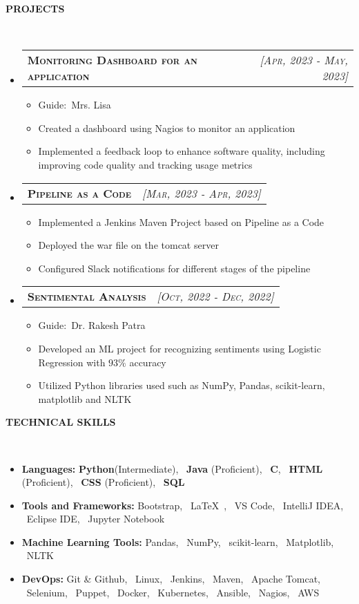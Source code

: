 \documentclass[a4paper,10pt]{article}
\makeatletter
\newcommand{\lsep}{-0.5cm}
\newcommand{\resitem}[1]{\item #1 \vspace{-2pt}}
\newcommand{\resheading}[1]{{\small \colorbox{mygrey}{\begin{minipage}{0.975\textwidth}{\textbf{#1 \vphantom{p\^{E}}}}\end{minipage}}}}
\newcommand{\ressubheading}[3]{
\begin{tabular*}{6.62in}{l @{\extracolsep{\fill}} r}
	\textsc{{\textbf{#1}}} & \textsc{\textit{[#2]}} \\
\end{tabular*}\vspace{-8pt}}
\makeatother
\begin{document}
\resheading{\textbf{PROJECTS} }\\[\lsep]
\begin{itemize}
\setlength\itemsep{0.5em}
\item \ressubheading{Monitoring Dashboard for an application} {Apr, 2023 - May, 2023}{}
\begin{itemize}
    \resitem{Guide:\ Mrs. Lisa}
    \resitem{Created a dashboard using Nagios to monitor an application}
    \resitem{Implemented a feedback loop to enhance software quality, including improving code quality and tracking usage metrics}
\end{itemize}

\item \ressubheading{Pipeline as a Code}{Mar, 2023 - Apr, 2023}{}
\begin{itemize}
    \resitem{Implemented a Jenkins Maven Project based on Pipeline as a Code}
    \resitem{Deployed the war file on the tomcat server}
    \resitem{Configured Slack notifications for different stages of the pipeline}
\end{itemize}

\item \ressubheading{Sentimental Analysis}{Oct, 2022 - Dec, 2022}{}
\begin{itemize}
    \resitem{Guide:\ Dr. Rakesh Patra}
    \resitem{Developed an ML project for recognizing sentiments using Logistic Regression with $93\%$ accuracy}
    \resitem{Utilized Python libraries used such as NumPy, Pandas, scikit-learn, matplotlib and NLTK}
\end{itemize} 
\end{itemize}

\resheading{\textbf{TECHNICAL SKILLS} }\\[\lsep]
\begin{itemize}
\setlength\itemsep{0em}
\item \noindent \textbf{Languages:} \textbf{Python}(Intermediate), \ \textbf{Java} (Proficient), \ \textbf{C}, \ \textbf{HTML} (Proficient), \ \textbf{CSS} (Proficient), \ \textbf{SQL}
\item \noindent\textbf{Tools and Frameworks:} Bootstrap, \  \LaTeX\ , \ VS Code, \ IntelliJ IDEA, \ Eclipse IDE, \ Jupyter Notebook
\item \noindent \textbf{Machine Learning Tools:} Pandas, \ NumPy, \ scikit-learn, \ Matplotlib, \ NLTK
\item \noindent \textbf{DevOps:} Git \& Github, \ Linux, \ Jenkins, \ Maven, \ Apache Tomcat, \ Selenium, \ Puppet, \ Docker, \ Kubernetes, \ Ansible, \ Nagios, \ AWS
\end{itemize}
\end{document}

